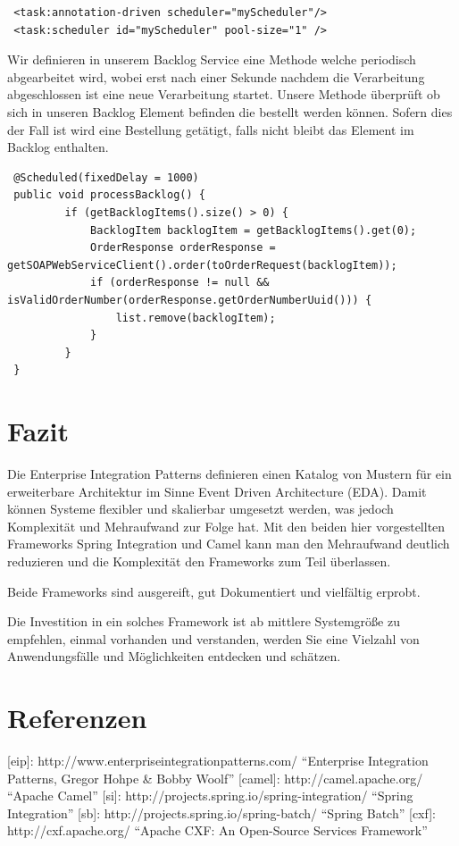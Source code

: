 \documentclass[12pt,a4paper,ngerman]{article}
\begin{document}
\begin{lstlisting}
 <task:annotation-driven scheduler="myScheduler"/>
 <task:scheduler id="myScheduler" pool-size="1" />
\end{lstlisting}

Wir definieren in unserem Backlog Service eine Methode welche periodisch
abgearbeitet wird, wobei erst nach einer Sekunde nachdem die
Verarbeitung abgeschlossen ist eine neue Verarbeitung startet. Unsere
Methode überprüft ob sich in unseren Backlog Element befinden die
bestellt werden können. Sofern dies der Fall ist wird eine Bestellung
getätigt, falls nicht bleibt das Element im Backlog enthalten.

\begin{lstlisting}
 @Scheduled(fixedDelay = 1000)
 public void processBacklog() {
         if (getBacklogItems().size() > 0) {
             BacklogItem backlogItem = getBacklogItems().get(0);
             OrderResponse orderResponse = getSOAPWebServiceClient().order(toOrderRequest(backlogItem));
             if (orderResponse != null && isValidOrderNumber(orderResponse.getOrderNumberUuid())) {
                 list.remove(backlogItem);
             } 
         }
 }
\end{lstlisting}

\section{Fazit}

Die Enterprise Integration Patterns definieren einen Katalog von Mustern
für ein erweiterbare Architektur im Sinne Event Driven Architecture
(EDA). Damit können Systeme flexibler und skalierbar umgesetzt werden,
was jedoch Komplexität und Mehraufwand zur Folge hat. Mit den beiden
hier vorgestellten Frameworks Spring Integration und Camel kann man den
Mehraufwand deutlich reduzieren und die Komplexität den Frameworks zum
Teil überlassen.

Beide Frameworks sind ausgereift, gut Dokumentiert und vielfältig
erprobt.

Die Investition in ein solches Framework ist ab mittlere Systemgröße zu
empfehlen, einmal vorhanden und verstanden, werden Sie eine Vielzahl von
Anwendungsfälle und Möglichkeiten entdecken und schätzen.

\section{Referenzen}

{[}eip{]}: http://www.enterpriseintegrationpatterns.com/ ``Enterprise
Integration Patterns, Gregor Hohpe \& Bobby Woolf'' {[}camel{]}:
http://camel.apache.org/ ``Apache Camel'' {[}si{]}:
http://projects.spring.io/spring-integration/ ``Spring Integration''
{[}sb{]}: http://projects.spring.io/spring-batch/ ``Spring Batch''
{[}cxf{]}: http://cxf.apache.org/ ``Apache CXF: An Open-Source Services
Framework''
\end{document}
